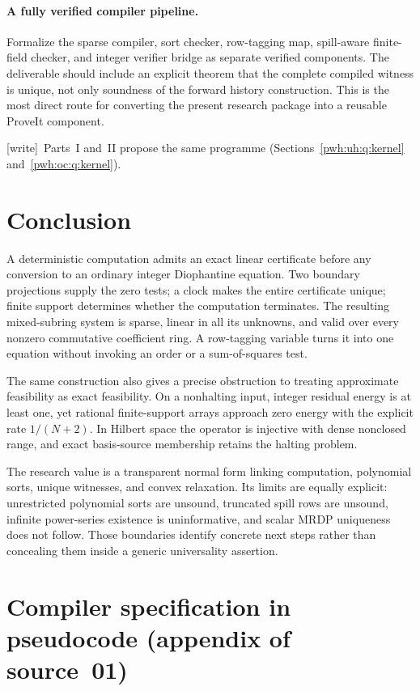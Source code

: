 \documentclass[11pt,letterpaper]{article}
\numberwithin{equation}{section}
\theoremstyle{definition}
\newcommand{\wtag}{\textup{[write]}}
\begin{document}
\paragraph{A fully verified compiler pipeline.}
Formalize the sparse compiler, sort checker, row-tagging map, spill-aware
finite-field checker, and integer verifier bridge as separate verified
components. The deliverable should include an explicit theorem that the
complete compiled witness is unique, not only soundness of the forward
history construction. This is the most direct route for converting the
present research package into a reusable ProveIt component.

\wtag\ Parts~I and~II propose the same programme
(Sections~\ref{pwh:uh:q:kernel} and~\ref{pwh:oc:q:kernel}).

\section{Conclusion}
A deterministic computation admits an exact linear certificate before
any conversion to an ordinary integer Diophantine equation. Two boundary
projections supply the zero tests; a clock makes the entire certificate
unique; finite support determines whether the computation terminates.
The resulting mixed-subring system is sparse, linear in all its
unknowns, and valid over every nonzero commutative coefficient ring.
A row-tagging variable turns it into one equation without invoking an
order or a sum-of-squares test.

The same construction also gives a precise obstruction to treating
approximate feasibility as exact feasibility. On a nonhalting input,
integer residual energy is at least one, yet rational finite-support
arrays approach zero energy with the explicit rate $1/(N+2)$. In
Hilbert space the operator is injective with dense nonclosed range,
and exact basis-source membership retains the halting problem.

The research value is a transparent normal form linking computation,
polynomial sorts, unique witnesses, and convex relaxation. Its limits
are equally explicit: unrestricted polynomial sorts are unsound,
truncated spill rows are unsound, infinite power-series existence is
uninformative, and scalar MRDP uniqueness does not follow. Those
boundaries identify concrete next steps rather than concealing them
inside a generic universality assertion.

\section{Compiler specification in pseudocode (appendix of source~01)}\label{pwh:bt:app:compiler}
\end{document}
